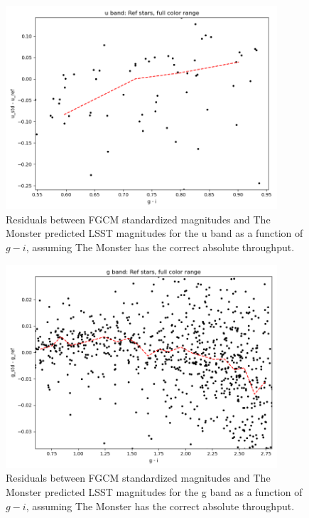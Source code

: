 \begin{figure}
  \begin{center}
    \includegraphics[width=0.9\textwidth]{photometric_calibration_figures/reference_residuals_u.png}
  \end{center}
  \caption{Residuals between FGCM standardized magnitudes and The Monster
    predicted LSST magnitudes for the u band as a function of $g-i$, assuming
    The Monster has the correct absolute throughput.}
\end{figure}

\begin{figure}
  \begin{center}
    \includegraphics[width=0.9\textwidth]{photometric_calibration_figures/reference_residuals_g.png}
  \end{center}
  \caption{Residuals between FGCM standardized magnitudes and The Monster
    predicted LSST magnitudes for the g band as a function of $g-i$, assuming
    The Monster has the correct absolute throughput.}
\end{figure}

